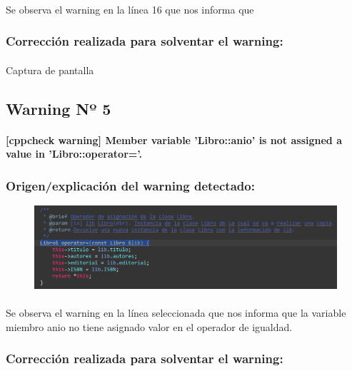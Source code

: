 			\paragraph{}Se observa el warning en la línea 16 que nos informa que 
			
		\subsubsection{Corrección realizada para solventar el warning:}
		
			\paragraph{}Captura de pantalla
			
	\subsection{Warning Nº 5}
	
		\paragraph{[cppcheck warning] Member variable 'Libro::anio' is not assigned a value in 'Libro::operator='.}
	
		\subsubsection{Origen/explicación del warning detectado:}
		
			\begin{figure}[H]
				\centering
				\includegraphics[scale=0.55]{img/esteban2.png}
				\label{esteban2}
			\end{figure}
		
			\paragraph{}Se observa el warning en la línea seleccionada que nos informa que la variable miembro anio no tiene asignado valor en el operador de igualdad.
			
		\subsubsection{Corrección realizada para solventar el warning:}
		
